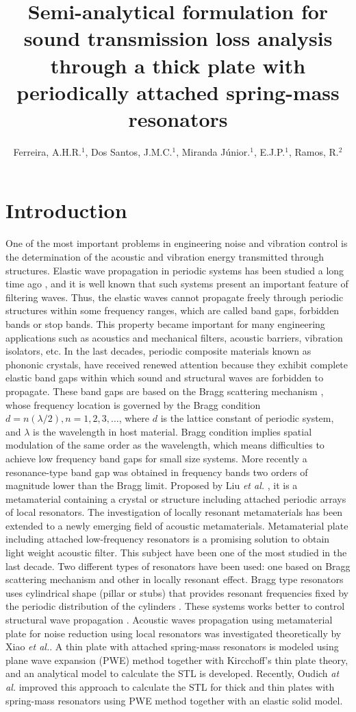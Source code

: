 \documentclass[a4paper]{ICEDyn}
\title{Semi-analytical formulation for sound transmission loss analysis through a thick plate with periodically attached spring-mass resonators}
\author{Ferreira, A.H.R.$ ^{1} $, Dos Santos, J.M.C.$ ^{1} $, Miranda J\'{u}nior.$ ^{1} $, E.J.P.$ ^{1} $, Ramos, R.$ ^{2} $\space}
\begin{document}
	
	\maketitle
	
	\section{Introduction}
	One of the most important problems in engineering noise and vibration control is the determination of the acoustic and vibration energy transmitted through structures. Elastic wave propagation in periodic systems has been studied a long time ago \cite{Brillouin53,Mead75}, and it is well known that such systems present an important feature of filtering waves. Thus, the elastic waves cannot propagate freely through periodic structures within some frequency ranges, which are called band gaps, forbidden bands or stop bands. This property became important for many engineering applications such as acoustics and mechanical filters, acoustic barriers, vibration isolators, etc. In the last decades, periodic composite materials known as phononic crystals, have received renewed attention because they exhibit complete elastic band gaps within which sound and structural waves are forbidden to propagate. These band gaps are based on the Bragg scattering mechanism \cite{Sigalas92}, whose frequency location is governed by the Bragg condition $d=n(\lambda/2), n=1,2,3,\ldots$, where $d$ is the lattice constant of periodic system, and $\lambda$ is the wavelength in host material. Bragg condition implies spatial modulation of the same order as the wavelength, which means difficulties to achieve low frequency band gaps for small size systems. More recently a resonance-type band gap was obtained in frequency bands two orders of magnitude lower than the Bragg limit. Proposed by Liu \textit{et al.} \cite{Liu2000}, it is a metamaterial containing a crystal or structure including attached periodic arrays of local resonators. The investigation of locally resonant metamaterials has been extended to a newly emerging field of acoustic metamaterials. Metamaterial plate including attached low-frequency resonators is a promising solution to obtain light weight acoustic filter. This subject have been one of the most studied in the last decade. Two different types of resonators have been used: one based on Bragg scattering mechanism and other in locally resonant effect.  Bragg type resonators uses cylindrical shape (pillar or stubs) that provides resonant frequencies fixed by the periodic distribution of the cylinders \cite{Pennec2008,Wu2006,Wu2010}. These systems works better to control structural wave propagation \cite{Oudich2010}. Acoustic waves propagation using metamaterial plate for noise reduction using local resonators was investigated theoretically by Xiao \textit{et al.}\cite{Xiao2012s}. A thin plate with attached spring-mass resonators is modeled using plane wave expansion (PWE) method \cite{Sigalas94} together with Kircchoff's thin plate theory, and an analytical model to calculate the STL is developed. Recently, Oudich \textit{at al.} \cite{Oudich2014} improved this approach to calculate the STL for thick and thin plates with spring-mass resonators using PWE method together with an elastic solid model. 
\end{document}
